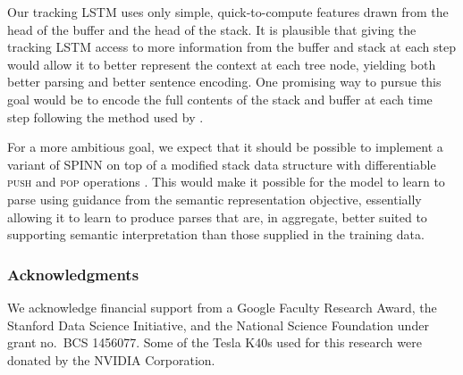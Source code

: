 \documentclass[11pt]{article}
\begin{document}
Our tracking LSTM uses only simple, quick-to-compute features drawn from the head of the buffer and the head of the stack. It is plausible that giving the tracking LSTM access to more information from the buffer and stack at each step would allow it to better represent the context at each tree node, yielding both better parsing and better sentence encoding. One promising way to pursue this goal would be to encode the full contents of the stack and buffer at each time step following the method used by \citet{dyer-EtAl:2015:ACL-IJCNLP}.

For a more ambitious goal, we expect that it should be possible to implement a variant of SPINN on top of a modified stack data structure with differentiable \textsc{push} and \textsc{pop} operations \citep[as in][]{grefenstette2015learning,joulin2015inferring}. This would make it possible for the model to learn to parse using guidance from the semantic representation objective, essentially allowing it to learn to produce parses that are, in aggregate, better suited to supporting semantic interpretation than those supplied in the training data.


\subsubsection*{Acknowledgments}

We acknowledge financial support from a Google Faculty Research Award, the Stanford Data Science Initiative, and the National Science Foundation under grant no.~BCS 1456077. Some of the Tesla K40s used for this research were donated by the NVIDIA Corporation.



\end{document}
